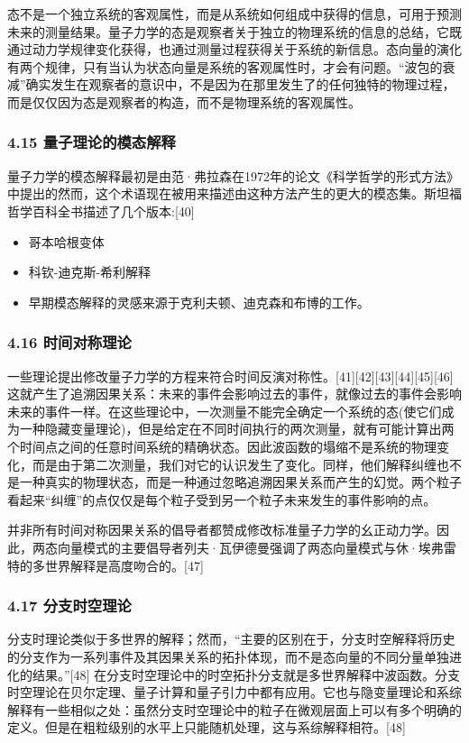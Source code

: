 态不是一个独立系统的客观属性，而是从系统如何组成中获得的信息，可用于预测未来的测量结果。量子力学的态是观察者关于独立的物理系统的信息的总结，它既通过动力学规律变化获得，也通过测量过程获得关于系统的新信息。态向量的演化有两个规律，只有当认为状态向量是系统的客观属性时，才会有问题。“波包的衰减”确实发生在观察者的意识中，不是因为在那里发生了的任何独特的物理过程，而是仅仅因为态是观察者的构造，而不是物理系统的客观属性。

\subsubsection{4.15 量子理论的模态解释}

量子力学的模态解释最初是由范·弗拉森在1972年的论文《科学哲学的形式方法》中提出的然而，这个术语现在被用来描述由这种方法产生的更大的模态集。斯坦福哲学百科全书描述了几个版本:[40]

\begin{itemize}
\item 哥本哈根变体
\item 科钦-迪克斯-希利解释
\item 早期模态解释的灵感来源于克利夫顿、迪克森和布博的工作。
\end{itemize}

\subsubsection{4.16 时间对称理论}

一些理论提出修改量子力学的方程来符合时间反演对称性。[41][42][43][44][45][46] 这就产生了追溯因果关系：未来的事件会影响过去的事件，就像过去的事件会影响未来的事件一样。在这些理论中，一次测量不能完全确定一个系统的态(使它们成为一种隐藏变量理论)，但是给定在不同时间执行的两次测量，就有可能计算出两个时间点之间的任意时间系统的精确状态。因此波函数的塌缩不是系统的物理变化，而是由于第二次测量，我们对它的认识发生了变化。同样，他们解释纠缠也不是一种真实的物理状态，而是一种通过忽略追溯因果关系而产生的幻觉。两个粒子看起来“纠缠”的点仅仅是每个粒子受到另一个粒子未来发生的事件影响的点。

并非所有时间对称因果关系的倡导者都赞成修改标准量子力学的幺正动力学。因此，两态向量模式的主要倡导者列夫·瓦伊德曼强调了两态向量模式与休·埃弗雷特的多世界解释是高度吻合的。[47]

\subsubsection{4.17 分支时空理论}

分支时理论类似于多世界的解释；然而，“主要的区别在于，分支时空解释将历史的分支作为一系列事件及其因果关系的拓扑体现，而不是态向量的不同分量单独进化的结果。”[48] 在分支时空理论中的时空拓扑分支就是多世界解释中波函数。分支时空理论在贝尔定理、量子计算和量子引力中都有应用。它也与隐变量理论和系综解释有一些相似之处：虽然分支时空理论中的粒子在微观层面上可以有多个明确的定义。但是在粗粒级别的水平上只能随机处理，这与系综解释相符。[48]


